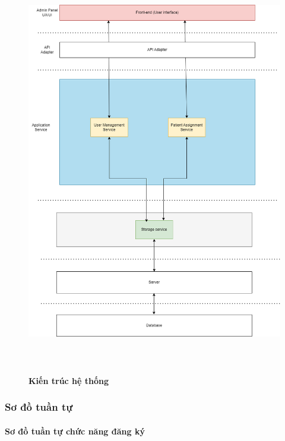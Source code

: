 \begin{figure}[H]
  \centering
  \includegraphics[width=16cm,height=18cm]{Images/system/fmECG_architecture-Admin.drawio.png}
  \caption[Kiến trúc hệ thống]{\bfseries \fontsize{12pt}{0pt}\selectfont Kiến trúc hệ thống}
  \label{hinh15} %
\end{figure}

\subsubsection{Sơ đồ tuần tự}

\paragraph{Sơ đồ tuần tự chức năng đăng ký}
\mbox{}

